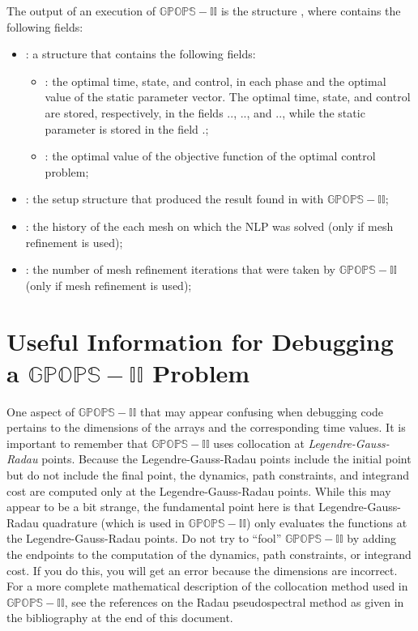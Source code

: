 \documentclass[10pt]{article}
\newcommand{\bfblue}[1]{\textrm{{\color{blue}{\bf #1}}}}
\newcommand{\slred}[1]{\textrm{\color{red}{\sl #1}}}
\begin{document}
The output of an execution of $\mathbb{GPOPS-II}$ is the structure \slred{output},
where \slred{output} contains the following fields:
\begin{itemize}
  \item \bfblue{result}:  a structure that contains the following fields:
    \begin{itemize}
      \item \bfblue{solution}:  the optimal time, state, and control,
        in each phase and the optimal value of the static parameter
        vector.  The optimal time, state, and control are stored, 
        respectively, in the fields \bfblue{solution}.\bfblue{phase($p$)}.\bfblue{time},
        \bfblue{solution}.\bfblue{phase($p$)}.\bfblue{state}, and
        \bfblue{solution}.\bfblue{phase($p$)}.\bfblue{control}, while the 
        static parameter is stored in the field
        \bfblue{solution}.\bfblue{parameter}; 
      \item \bfblue{objective}:  the optimal value of the objective function of the optimal control problem;
      \end{itemize}
      \item \bfblue{resultsetup}:  the setup structure that produced the result found in \bfblue{result} with $\mathbb{GPOPS-II}$;
      \item \bfblue{meshhistory}:  the history of the each mesh on
        which the NLP was solved (only if mesh refinement is used);
      \item \bfblue{meshiterations}:  the number of mesh refinement
        iterations that were taken by $\mathbb{GPOPS-II}$ (only if mesh refinement is used);
\end{itemize}

\section{Useful Information for Debugging a $\mathbb{GPOPS-II}$ Problem}

One aspect of $\mathbb{GPOPS-II}$ that may appear confusing when debugging
code pertains to the dimensions of the arrays and the corresponding
time values.  It is important to remember that $\mathbb{GPOPS-II}$ uses
collocation at {\em Legendre-Gauss-Radau} points.  Because the
Legendre-Gauss-Radau points include the initial point but do not
include the final point, the dynamics, path constraints, and integrand
cost are computed only at the Legendre-Gauss-Radau points.  While this
may appear to be a bit strange, the fundamental point here is that
Legendre-Gauss-Radau quadrature (which is used in $\mathbb{GPOPS-II}$) only
evaluates the functions at the Legendre-Gauss-Radau points.  Do not
try to ``fool'' $\mathbb{GPOPS-II}$ by adding the endpoints to the computation of
the dynamics, path constraints, or integrand cost.  If you do this,
you will get an error because the dimensions are incorrect.  For a
more complete mathematical description of the collocation method used
in $\mathbb{GPOPS-II}$, see the references on the Radau pseudospectral method as
given in the bibliography at the end of this document. 
\end{document}
